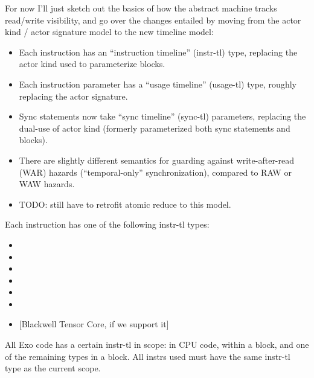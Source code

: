 For now I'll just sketch out the basics of how the abstract machine tracks read/write visibility, and go over the changes entailed by moving from the actor kind / actor signature model to the new timeline model:
\begin{itemize}
  \item Each instruction has an ``instruction timeline'' (instr-tl) type, replacing the actor kind used to parameterize  blocks.
  \filbreak
  \item Each instruction parameter has a ``usage timeline'' (usage-tl) type, roughly replacing the actor signature.
  \filbreak
  \item Sync statements now take ``sync timeline'' (sync-tl) parameters, replacing the dual-use of actor kind (formerly parameterized both sync statements and  blocks).
  \filbreak
  \item There are slightly different semantics for guarding against write-after-read (WAR) hazards (``temporal-only'' synchronization), compared to RAW or WAW hazards.
  \filbreak
  \item TODO: still have to retrofit atomic reduce to this model.
\end{itemize}

\filbreak
{}

Each instruction has one of the following instr-tl types:

\begin{itemize}
  \item {}
  \filbreak
  \item {}
  \filbreak
  \item {}
  \filbreak
  \item {}
  \filbreak
  \item {}
  \filbreak
  \item {}
  \filbreak
  \item {}  [Blackwell Tensor Core, if we support it]
\end{itemize}
\filbreak
All Exo code has a certain instr-tl in scope:  in CPU code,  within a  block, and one of the remaining types in a  block.
All instrs used must have the same instr-tl type as the current scope.

\filbreak
{}

